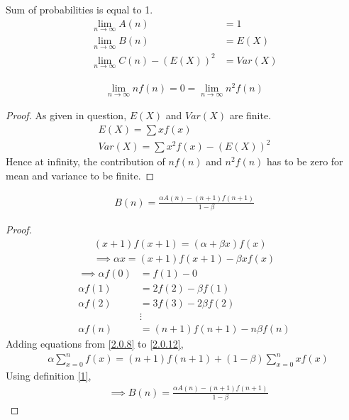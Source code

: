 \documentclass[journal,12pt,twocolumn]{IEEEtran}
\begin{document}
\begin{definition}
\label{2}
Sum of probabilities is equal to 1.
\begin{align}
\lim_{n\to\infty}A(n)&=1\\
\lim_{n\to\infty}B(n)&=E(X)\\
\lim_{n\to\infty}C(n)-(E(X))^2&=Var(X)
\end{align}
\end{definition}

\begin{lemma}
\label{2.1}
\begin{align}
\lim_{n\to\infty}nf(n)=0 =\lim_{n\to\infty}n^2f(n)
\end{align}
\end{lemma}
\begin{proof}
As given in question, $E(X)$ and $Var(X)$ are finite.
\begin{align}
    E(X)=\sum xf(x)\\
    Var(X)=\sum x^2f(x)-(E(X))^2
\end{align}
Hence at infinity, the contribution of $nf(n)$ and $n^2f(n)$ has to be zero for mean and variance to be finite.
\end{proof}

\begin{lemma}
\label{2.2}
\begin{align}
    B(n)=\frac{\alpha A(n)-(n+1)f(n+1)}{1-\beta}
\end{align}
\end{lemma}
\begin{proof}
\begin{align}
    (x+1)f(x+1)=(\alpha+\beta x)f(x)\label{2.0.6}\\
    \implies \alpha x = (x+1)f(x+1) - \beta xf(x)
\end{align}
\begin{align}
    \implies\alpha f(0) &= f(1)-0\label{2.0.8}\\
    \alpha f(1) &= 2f(2) - \beta f(1)\\
    \alpha f(2) &= 3f(3) - 2\beta f(2)\\
    &\vdots\\
    \alpha f(n) &= (n+1)f(n+1) - n\beta f(n)\label{2.0.12}
\end{align}
Adding equations from \eqref{2.0.8} to \eqref{2.0.12},
\begin{align}
  &\alpha\sum_{x=0}^nf(x)=(n+1)f(n+1)+(1-\beta)\sum_{x=0}^nxf(x)
\end{align}
Using definition \eqref{1},
\begin{align}
    &\implies B(n)=\frac{\alpha A(n)-(n+1)f(n+1)}{1-\beta}
\end{align}
\end{proof}
\end{document}
